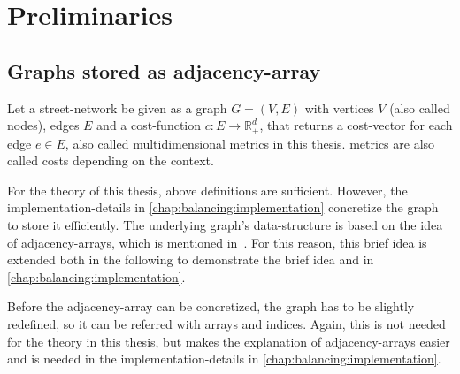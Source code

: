 \chapter{Preliminaries}
\label{chap:preliminaries}


\section{Graphs stored as adjacency-array}
\label{chap:preliminaries:graphs}

    Let a street-network be given as a graph $G = (V, E)$ with vertices $V$ (also called nodes), edges $E$ and a cost-function $c: E \to \mathbb{R}_+^d$, that returns a cost-vector for each edge $e \in E$, also called multidimensional \glspl{metric} in this thesis.
    \Glspl{metric} are also called \glspl{cost} depending on the context.

    For the theory of this thesis, above definitions are sufficient.
    However, the implementation-details in \cref{chap:balancing:implementation} concretize the graph to store it efficiently.
    The underlying graph's data-structure is based on the idea of adjacency-arrays, which is mentioned in~\cite{mehlhorn:algorithms}.
    For this reason, this brief idea is extended both in the following to demonstrate the brief idea and in \cref{chap:balancing:implementation}.

    Before the adjacency-array can be concretized, the graph has to be slightly redefined, so it can be referred with arrays and indices.
    Again, this is not needed for the theory in this thesis, but makes the explanation of adjacency-arrays easier and is needed in the implementation-details in \cref{chap:balancing:implementation}.

